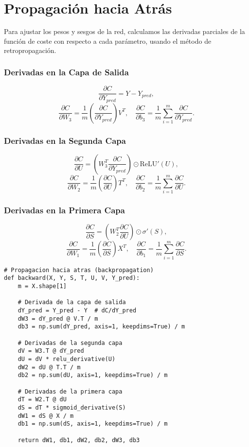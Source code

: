 \documentclass[paper=a4, fontsize=11pt]{scrartcl} %
\numberwithin{equation}{section} %
\numberwithin{figure}{section} %
\numberwithin{table}{section} %
\begin{document}
\section{Propagación hacia Atrás}

Para ajustar los pesos y sesgos de la red, calculamos las derivadas parciales de la función de coste con respecto a cada parámetro, usando el método de retropropagación.

\subsubsection{Derivadas en la Capa de Salida}

\[
\frac{\partial C}{\partial Y_{pred}} = Y - Y_{pred},
\]
\[
\frac{\partial C}{\partial W_3} = \frac{1}{m} \left( \frac{\partial C}{\partial Y_{pred}} \right) V^T, \quad \frac{\partial C}{\partial b_3} = \frac{1}{m} \sum_{i=1}^m \frac{\partial C}{\partial Y_{pred}}.
\]

\subsubsection{Derivadas en la Segunda Capa}

\[
\frac{\partial C}{\partial U} = \left( W_3^T \frac{\partial C}{\partial Y_{pred}} \right) \odot \text{ReLU}'(U),
\]
\[
\frac{\partial C}{\partial W_2} = \frac{1}{m} \left( \frac{\partial C}{\partial U} \right) T^T, \quad \frac{\partial C}{\partial b_2} = \frac{1}{m} \sum_{i=1}^m \frac{\partial C}{\partial U}.
\]

\subsubsection{Derivadas en la Primera Capa}

\[
\frac{\partial C}{\partial S} = \left( W_2^T \frac{\partial C}{\partial U} \right) \odot \sigma'(S),
\]
\[
\frac{\partial C}{\partial W_1} = \frac{1}{m} \left( \frac{\partial C}{\partial S} \right) X^T, \quad \frac{\partial C}{\partial b_1} = \frac{1}{m} \sum_{i=1}^m \frac{\partial C}{\partial S}.
\]

\vspace{2mm}
\begin{lstlisting}
# Propagacion hacia atras (backpropagation)
def backward(X, Y, S, T, U, V, Y_pred):
    m = X.shape[1]

    # Derivada de la capa de salida
    dY_pred = Y_pred - Y  # dC/dY_pred
    dW3 = dY_pred @ V.T / m
    db3 = np.sum(dY_pred, axis=1, keepdims=True) / m

    # Derivadas de la segunda capa
    dV = W3.T @ dY_pred
    dU = dV * relu_derivative(U)
    dW2 = dU @ T.T / m
    db2 = np.sum(dU, axis=1, keepdims=True) / m

    # Derivadas de la primera capa
    dT = W2.T @ dU
    dS = dT * sigmoid_derivative(S)
    dW1 = dS @ X / m
    db1 = np.sum(dS, axis=1, keepdims=True) / m

    return dW1, db1, dW2, db2, dW3, db3
\end{lstlisting}
\vspace{2mm}
\end{document}
